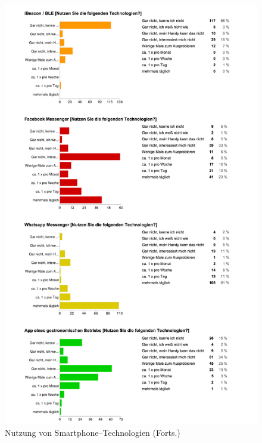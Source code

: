 \begin{figure}[H]
\begin{center}
\includegraphics[width=.9\textwidth]{u03b.jpg}
\caption{Nutzung von Smartphone–Technologien (Forts.)}
\label{pic:aus3b}
\end{center}
\end{figure}

